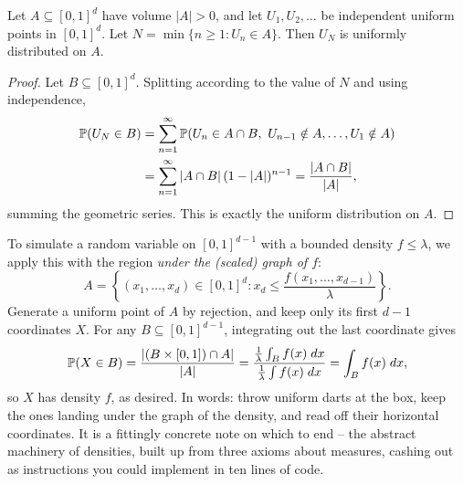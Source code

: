 \documentclass[a4paper]{scrartcl}
\begin{document}
\begin{theorem}
	Let $A \subseteq [0, 1]^d$ have volume $|A| > 0$, and let $U_1, U_2, \dots$ be independent uniform points in $[0,1]^d$. Let $N = \min\{n \geq 1 : U_n \in A\}$. Then $U_N$ is uniformly distributed on $A$.
\end{theorem}
\begin{proof}
	Let $B \subseteq [0,1]^d$. Splitting according to the value of $N$ and using independence,
	\begin{align*}
		\mathbb{P}(U_N \in B) &= \sum_{n = 1}^{\infty} \mathbb{P}(U_n \in A \cap B,\ U_{n-1} \notin A, \dots, U_1 \notin A) \\
		&= \sum_{n = 1}^{\infty} |A \cap B| \, (1 - |A|)^{n - 1} = \frac{|A \cap B|}{|A|},
	\end{align*}
	summing the geometric series. This is exactly the uniform distribution on $A$.
\end{proof}

To simulate a random variable on $[0,1]^{d-1}$ with a bounded density $f \leq \lambda$, we apply this with the region \emph{under the (scaled) graph of $f$}:
$$
A = \left\{(x_1, \dots, x_d) \in [0,1]^d : x_d \leq \frac{f(x_1, \dots, x_{d-1})}{\lambda}\right\}.
$$
Generate a uniform point of $A$ by rejection, and keep only its first $d - 1$ coordinates $X$. For any $B \subseteq [0,1]^{d - 1}$, integrating out the last coordinate gives
$$
\mathbb{P}(X \in B) = \frac{|(B \times [0,1]) \cap A|}{|A|} = \frac{\frac{1}{\lambda}\int_B f(x)\; d x}{\frac{1}{\lambda}\int f(x) \; d x} = \int_B f(x)\; d x,
$$
so $X$ has density $f$, as desired. In words: throw uniform darts at the box, keep the ones landing under the graph of the density, and read off their horizontal coordinates. It is a fittingly concrete note on which to end -- the abstract machinery of densities, built up from three axioms about measures, cashing out as instructions you could implement in ten lines of code.
\end{document}
